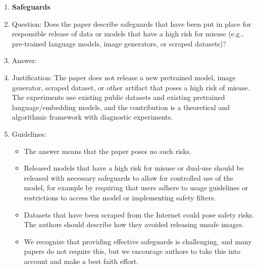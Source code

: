 \documentclass{article}
\theoremstyle{definition}
\theoremstyle{remark}
\theoremstyle{remark}
\begin{document}
\begin{enumerate}
\begin{itemize}
        \item If there are negative societal impacts, the authors could also discuss possible mitigation strategies (e.g., gated release of models, providing defenses in addition to attacks, mechanisms for monitoring misuse, mechanisms to monitor how a system learns from feedback over time, improving the efficiency and accessibility of ML).
    \end{itemize}
    
\item {\bf Safeguards}
    \item[] Question: Does the paper describe safeguards that have been put in place for responsible release of data or models that have a high risk for misuse (e.g., pre-trained language models, image generators, or scraped datasets)?
    \item[] Answer: \answerNA{} %
    \item[] Justification: The paper does not release a new pretrained model, image generator, scraped dataset, or other artifact that poses a high risk of misuse. The experiments use existing public datasets and existing pretrained language/embedding models, and the contribution is a theoretical and algorithmic framework with diagnostic experiments.
    \item[] Guidelines:
    \begin{itemize}
        \item The answer \answerNA{} means that the paper poses no such risks.
        \item Released models that have a high risk for misuse or dual-use should be released with necessary safeguards to allow for controlled use of the model, for example by requiring that users adhere to usage guidelines or restrictions to access the model or implementing safety filters. 
        \item Datasets that have been scraped from the Internet could pose safety risks. The authors should describe how they avoided releasing unsafe images.
        \item We recognize that providing effective safeguards is challenging, and many papers do not require this, but we encourage authors to take this into account and make a best faith effort.
    \end{itemize}


\end{enumerate}
\end{document}
